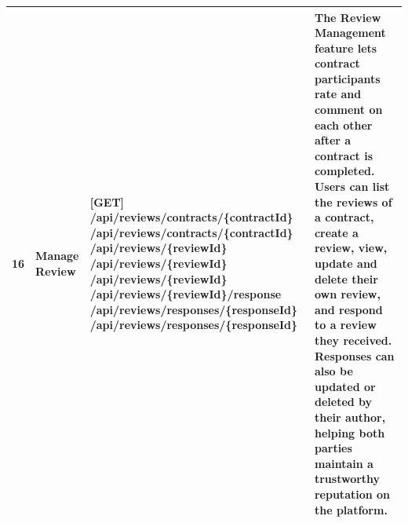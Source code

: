 \begin{longtable}{|C{0.7cm}|L{2.6cm}|S{6.6cm}|L{5.2cm}|}
16
&
\textbf{Manage Review}
&
[GET] /\allowbreak{}api/\allowbreak{}reviews/\allowbreak{}contracts/\allowbreak{}\{contractId\} \newline
[POST] /\allowbreak{}api/\allowbreak{}reviews/\allowbreak{}contracts/\allowbreak{}\{contractId\} \newline
[GET] /\allowbreak{}api/\allowbreak{}reviews/\allowbreak{}\{reviewId\} \newline
[PATCH] /\allowbreak{}api/\allowbreak{}reviews/\allowbreak{}\{reviewId\} \newline
[DELETE] /\allowbreak{}api/\allowbreak{}reviews/\allowbreak{}\{reviewId\} \newline
[POST] /\allowbreak{}api/\allowbreak{}reviews/\allowbreak{}\{reviewId\}/\allowbreak{}response \newline
[PATCH] /\allowbreak{}api/\allowbreak{}reviews/\allowbreak{}responses/\allowbreak{}\{responseId\} \newline
[DELETE] /\allowbreak{}api/\allowbreak{}reviews/\allowbreak{}responses/\allowbreak{}\{responseId\}
&
The Review Management feature lets contract participants rate and comment on each other after a contract is completed. Users can list the reviews of a contract, create a review, view, update and delete their own review, and respond to a review they received. Responses can also be updated or deleted by their author, helping both parties maintain a trustworthy reputation on the platform.
\\ \hline


\end{longtable}
